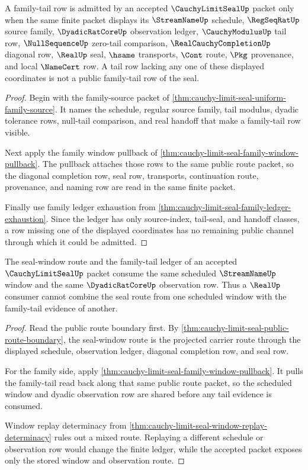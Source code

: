 \begin{theorem}
\label{thm:cauchy-limit-seal-family-tail-admission}
A family-tail row is admitted by an accepted $\CauchyLimitSealUp$ packet only when the same finite packet displays its $\StreamNameUp$ schedule, $\RegSeqRatUp$ source family, $\DyadicRatCoreUp$ observation ledger, $\CauchyModulusUp$ tail row, $\NullSequenceUp$ zero-tail comparison, $\RealCauchyCompletionUp$ diagonal row, $\RealUp$ seal, $\hsame$ transports, $\Cont$ route, $\Pkg$ provenance, and local $\NameCert$ row. A tail row lacking any one of these displayed coordinates is not a public family-tail row of the seal.
\end{theorem}
\begin{proof}
Begin with the family-source packet of \autoref{thm:cauchy-limit-seal-uniform-family-source}. It names the schedule, regular source family, tail modulus, dyadic tolerance rows, null-tail comparison, and real handoff that make a family-tail row visible.

Next apply the family window pullback of \autoref{thm:cauchy-limit-seal-family-window-pullback}. The pullback attaches those rows to the same public route packet, so the diagonal completion row, seal row, transports, continuation route, provenance, and naming row are read in the same finite packet.

Finally use family ledger exhaustion from \autoref{thm:cauchy-limit-seal-family-ledger-exhaustion}. Since the ledger has only source-index, tail-seal, and handoff classes, a row missing one of the displayed coordinates has no remaining public channel through which it could be admitted.
\end{proof}

\begin{theorem}
\label{thm:cauchy-limit-seal-seal-window-ledger-compatibility}
The seal-window route and the family-tail ledger of an accepted $\CauchyLimitSealUp$ packet consume the same scheduled $\StreamNameUp$ window and the same $\DyadicRatCoreUp$ observation row. Thus a $\RealUp$ consumer cannot combine the seal route from one scheduled window with the family-tail evidence of another.
\end{theorem}
\begin{proof}
Read the public route boundary first. By \autoref{thm:cauchy-limit-seal-public-route-boundary}, the seal-window route is the projected carrier route through the displayed schedule, observation ledger, diagonal completion row, and seal row.

For the family side, apply \autoref{thm:cauchy-limit-seal-family-window-pullback}. It pulls the family-tail read back along that same public route packet, so the scheduled window and dyadic observation row are shared before any tail evidence is consumed.

Window replay determinacy from \autoref{thm:cauchy-limit-seal-window-replay-determinacy} rules out a mixed route. Replaying a different schedule or observation row would change the finite ledger, while the accepted packet exposes only the stored window and observation route.
\end{proof}

